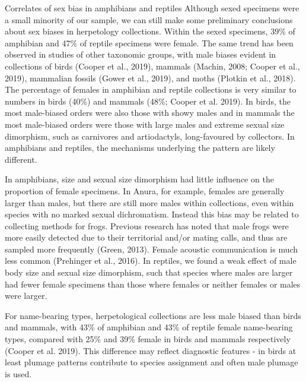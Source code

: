 \documentclass[a4paper, 12pt]{article}
\begin{document}
Correlates of sex bias in amphibians and reptiles
Although sexed specimens were a small minority of our sample, we can still make some preliminary conclusions about sex biases in herpetology collections. Within the sexed specimens, 39\% of amphibian and 47\% of reptile specimens were female. The same trend has been observed in studies of other taxonomic groups, with male biases evident in collections of birds (Cooper et al., 2019), mammals (Machin, 2008; Cooper et al., 2019), mammalian fossils (Gower et al., 2019), and moths (Plotkin et al., 2018). The percentage of females in amphibian and reptile collections is very similar to numbers in birds (40\%) and mammals (48\%; Cooper et al. 2019). In birds, the most male-biased orders were also those with showy males and in mammals the most male-biased orders were those with large males and extreme sexual size dimorphism, such as carnivores and artiodactyls, long-favoured by collectors. In amphibians and reptiles, the mechanisms underlying the pattern are likely different. 

In amphibians, size and sexual size dimorphism had little influence on the proportion of female specimens. In Anura, for example, females are generally larger than males, but there are still more males within collections, even within species with no marked sexual dichromatism. Instead this bias may be related to collecting methods for frogs. Previous research has noted that male frogs were more easily detected due to their territorial and/or mating calls, and thus are sampled more frequently (Green, 2013). Female acoustic communication is much less common (Prehinger et al., 2016). In reptiles, we found a weak effect of male body size and sexual size dimorphism, such that species where males are larger had fewer female specimens than those where females or neither females or males were larger. 

For name-bearing types, herpetological collections are less male biased than birds and mammals, with 43\% of amphibian and 43\% of reptile female name-bearing types, compared with 25\% and 39\% female in birds and mammals respectively (Cooper et al. 2019). This difference may reflect diagnostic features - in birds at least plumage patterns contribute to species assignment and often male plumage is used. 
\end{document}
